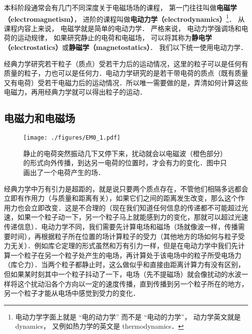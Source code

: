 
\begin{issues}
\issueTODO
\end{issues}


本科阶段通常会有几门不同深度关于电磁场场的课程， 第一门往往叫做\textbf{电磁学（electromagnetism）}， 进阶的课程叫做\textbf{电动力学（electrodynamics）}\footnote{电动力学字面上就是 “电的动力学” 而不是 “电动的力学”， 动力学英文就是 dynamics， 又例如热力学的英文是 thermodynamics．}． 从课程内容上来说， 电磁学就是简单的电动力学． 严格来说， 电动力学强调场和电荷的运动规律， 如果研究静止的电荷和电磁场， 可以将其称为\textbf{静电学（electrostatics）}或\textbf{静磁学（magnetostatics）}． 我们以下统一使用电动力学．

经典力学研究若干粒子（质点）受若干力后的运动情况，这里的粒子可以是任何有质量的粒子，力也可以是任何力．电动力学研究的是若干带电荷的质点（既有质量又有电荷）受若干电磁力后的运动情况．所以唯一需要做的是，弄清如何计算这些电磁力，再用经典力学就可以得出粒子的运动．

\subsection{电磁力和电磁场}

\begin{figure}[ht]
\centering
\texttt{[image: ./figures/EM0\_1.pdf]}
\caption{静止的电荷突然振动几下又停下来，扰动就会以电磁波（橙色部分）的形式向外传播，到达另一电荷的位置时，才会有力的变化．图中只画出了一个电荷产生的场．} \label{EM0_fig1}
\end{figure}

经典力学中万有引力是超距的，就是说只要两个质点存在，不管他们相隔多远都会立即有作用力（与质量和距离有关），如果它们之间的距离发生改变，那么这个作用力也会立即改变．这是不合理的（现在我们知道任何信息的传递都不可能超过光速，如果一个粒子动一下，另一个粒子马上就能感到力的变化，那就可以超过光速传递信息）．电动力学不同，我们需要先计算电场和磁场（场就像波一样，传播需要时间），再根据粒子所在位置的场计算粒子的受力（其他地方的场如何与粒子受力无关）．例如库仑定理的形式虽然和万有引力一样，但是在电动力学中我们先计算一个粒子在另一个粒子处产生的电场，再计算处于该电场中的粒子所受电场力（库仑力）．当两个粒子都静止时，这么做似乎和直接由距离计算力有没有区别，但如果某时刻其中一个粒子抖动了一下，电场（先不提磁场）就会像扰动的水波一样将这个扰动沿各个方向以一定的速度传播，直到传播到另一个粒子所在的地方，另一个粒子才能从电场中感觉到受力的变化．

